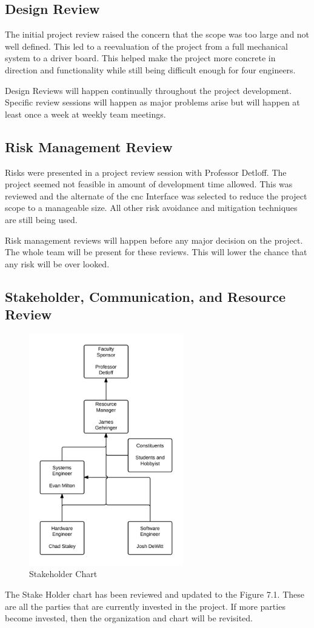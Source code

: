 \subsection{Design Review}
The initial project review raised the concern that the scope was too large and not well defined.
This led to a reevaluation of the project from a full mechanical system to a driver board.
This helped make the project more concrete in direction and functionality while still being difficult enough for four engineers.

Design Reviews will happen continually throughout the project development. 
Specific review sessions will happen as major problems arise but will happen at least once a week at weekly team meetings.
\subsection{Risk Management Review}
Risks were presented in a project review session with Professor Detloff.
The project seemed not feasible in amount of development time allowed.
This was reviewed and the alternate of the \gls{cnc} Interface was selected to reduce the project scope to a manageable size. 
All other risk avoidance and mitigation techniques are still being used.   

Risk management reviews will happen before any major decision on the project.
The whole team will be present for these reviews. 
This will lower the chance that any risk will be over looked.

\subsection{Stakeholder, Communication, and Resource Review}
\begin{figure}[H]
\centering
\includegraphics[width=0.6\textwidth]{shc.jpeg}
\caption{Stakeholder Chart}
\label{fig:Stakeholder Chart}
\end{figure}
The Stake Holder chart has been reviewed and updated to the Figure 7.1.
These are all the parties that are currently invested in the project. 
If more parties become invested, then the organization and chart will be revisited. 

